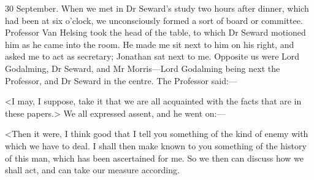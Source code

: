 \begin{diary}{30 September.}
When we met in Dr Seward's study two hours after dinner, which had been at six o'clock, we unconsciously formed a sort of board or committee. Professor Van Helsing took the head of the table, to which Dr Seward motioned him as he came into the room. He made me sit next to him on his right, and asked me to act as secretary; Jonathan sat next to me. Opposite us were Lord Godalming, Dr Seward, and Mr Morris—Lord Godalming being next the Professor, and Dr Seward in the centre. The Professor said:—

<I may, I suppose, take it that we are all acquainted with the facts that are in these papers.> We all expressed assent, and he went on:—

<Then it were, I think good that I tell you something of the kind of enemy with which we have to deal. I shall then make known to you something of the history of this man, which has been ascertained for me. So we then can discuss how we shall act, and can take our measure according.


\end{diary}
